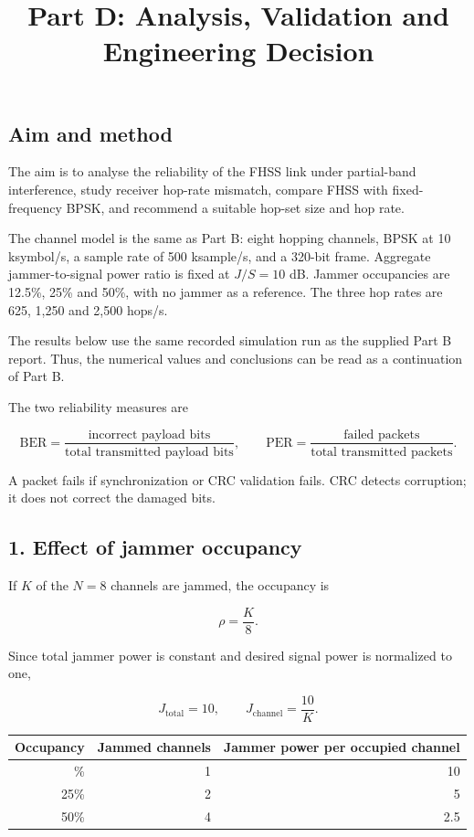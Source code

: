 \documentclass[
  11pt,
]{article}
\title{Part D: Analysis, Validation and Engineering Decision}
\author{}
\date{}
\newcounter{none} %
\begin{document}
\maketitle

\subsection{Aim and method}\label{aim-and-method}

The aim is to analyse the reliability of the FHSS link under
partial-band interference, study receiver hop-rate mismatch, compare
FHSS with fixed-frequency BPSK, and recommend a suitable hop-set size
and hop rate.

The channel model is the same as Part B: eight hopping channels, BPSK at
10 ksymbol/s, a sample rate of 500 ksample/s, and a 320-bit frame.
Aggregate jammer-to-signal power ratio is fixed at \(J/S=10\) dB. Jammer
occupancies are 12.5\%, 25\% and 50\%, with no jammer as a reference.
The three hop rates are 625, 1,250 and 2,500 hops/s.

The results below use the same recorded simulation run as the supplied
Part B report. Thus, the numerical values and conclusions can be read as
a continuation of Part B.

The two reliability measures are

\[\mathrm{BER}=\frac{\text{incorrect payload bits}}{\text{total transmitted payload bits}},
\qquad
\mathrm{PER}=\frac{\text{failed packets}}{\text{total transmitted packets}}.\]

A packet fails if synchronization or CRC validation fails. CRC detects
corruption; it does not correct the damaged bits.

\subsection{1. Effect of jammer
occupancy}\label{effect-of-jammer-occupancy}

If \(K\) of the \(N=8\) channels are jammed, the occupancy is

\[\rho=\frac{K}{8}.\]

Since total jammer power is constant and desired signal power is
normalized to one,

\[J_{\mathrm{total}}=10,\qquad J_{\mathrm{channel}}=\frac{10}{K}.\]

{\def\LTcaptype{none} %
\begin{longtable}[]{@{}rrr@{}}
\toprule\noalign{}
Occupancy & Jammed channels & Jammer power per occupied channel \\
\midrule\noalign{}
\endhead
\bottomrule\noalign{}
\endlastfoot
12.5\% & 1 & 10 \\
25\% & 2 & 5 \\
50\% & 4 & 2.5 \\
\end{longtable}
}
\end{document}
